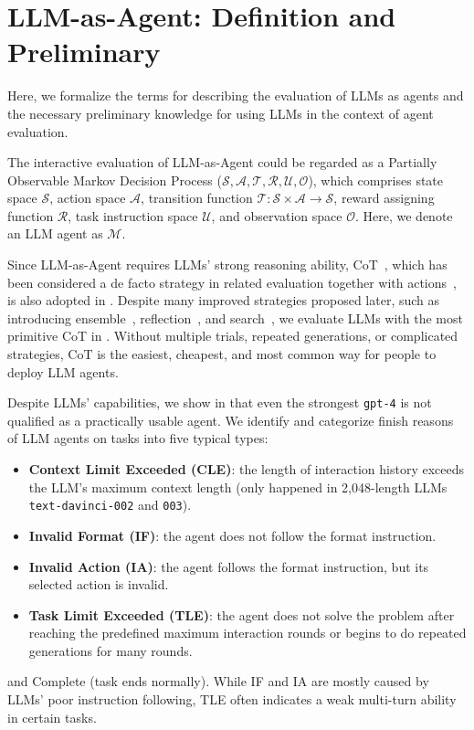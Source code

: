 

\section{LLM-as-Agent: Definition and Preliminary} \label{sec:preliminary}
Here, we formalize the terms for describing the evaluation of LLMs as agents and the necessary preliminary knowledge for using LLMs in the context of agent evaluation.

The interactive evaluation of LLM-as-Agent could be regarded as a Partially Observable Markov Decision Process ($\mathcal{S}, \mathcal{A}, \mathcal{T}, \mathcal{R}, \mathcal{U}, \mathcal{O}$), which comprises state space $\mathcal{S}$, action space $\mathcal{A}$, transition function $\mathcal{T}: \mathcal{S}\times\mathcal{A}\to\mathcal{S}$, reward assigning function $\mathcal{R}$, task instruction space $\mathcal{U}$, and observation space $\mathcal{O}$.
Here, we denote an LLM agent as $\mathcal{M}$.

Since LLM-as-Agent requires LLMs' strong reasoning ability, CoT~\citep{wei2022chain}, which has been considered a de facto strategy in related evaluation together with actions~\citep{yao2023react}, is also adopted in \model.
Despite many improved strategies proposed later, such as introducing ensemble~\citep{wang2023self}, reflection~\citep{shinn2023reflexion}, and search~\citep{yao2023tree}, we evaluate LLMs with the most primitive CoT in \model.
Without multiple trials, repeated generations, or complicated strategies, CoT is the easiest, cheapest, and most common way for people to deploy LLM agents.

Despite LLMs' capabilities, we show in \model that even the strongest \texttt{gpt-4} is not qualified as a practically usable agent.
We identify and categorize finish reasons of LLM agents on \model tasks into five typical types:
\begin{itemize}[leftmargin=1.5em,itemsep=0pt,parsep=0.2em,topsep=0.0em,partopsep=0.0em]
\item \textbf{Context Limit Exceeded (CLE)}: the length of interaction history exceeds the LLM's maximum context length (only happened in 2,048-length LLMs \texttt{text-davinci-002} and \texttt{003}).
\item \textbf{Invalid Format (IF)}: the agent does not follow the format instruction.
\item \textbf{Invalid Action (IA)}: the agent follows the format instruction, but its selected action is invalid.
\item \textbf{Task Limit Exceeded (TLE)}: the agent does not solve the problem after reaching the predefined maximum interaction rounds or begins to do repeated generations for many rounds.
\end{itemize}
and Complete (task ends normally).
While IF and IA are mostly caused by LLMs' poor instruction following, TLE often indicates a weak multi-turn ability in certain tasks.